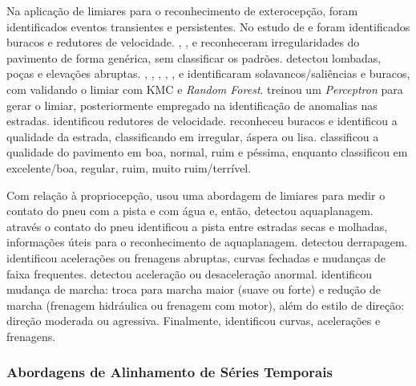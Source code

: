 Na aplicação de limiares para o reconhecimento de exterocepção, foram identificados eventos transientes e persistentes. No estudo de  e  foram identificados buracos e redutores de velocidade. , ,  e  reconheceram irregularidades do pavimento de forma genérica, sem classificar os padrões.  detectou lombadas, poças e elevações abruptas. , , , , ,  e  identificaram solavancos/saliências e buracos, com  validando o limiar com KMC e \textit{Random Forest}.  treinou um \textit{Perceptron} para gerar o limiar, posteriormente empregado na identificação de anomalias nas estradas.  identificou redutores de velocidade.  reconheceu buracos e identificou a qualidade da estrada, classificando em irregular, áspera ou lisa.  classificou a qualidade do pavimento em boa, normal, ruim e péssima, enquanto  classificou em excelente/boa, regular, ruim, muito ruim/terrível.

Com relação à propriocepção,  usou uma abordagem de limiares para medir o contato do pneu com a pista e com água e, então, detectou aquaplanagem.  através o contato do pneu identificou a pista entre estradas secas e molhadas, informações úteis para o reconhecimento de aquaplanagem.  detectou derrapagem.  identificou acelerações ou frenagens abruptas, curvas fechadas e mudanças de faixa frequentes.  detectou aceleração ou desaceleração anormal.  identificou mudança de marcha: troca para marcha maior (suave ou forte) e redução de marcha (frenagem hidráulica ou frenagem com motor), além do estilo de direção: direção moderada ou agressiva. Finalmente,  identificou curvas, acelerações e frenagens. 

\subsubsection{Abordagens de Alinhamento de Séries Temporais} 

